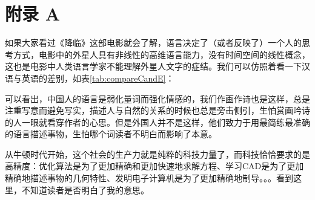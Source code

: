 \documentclass[UTF8,oneside]{ctexbook}
\begin{document}
\chapter*{附录 A}\label{fuluA}
如果大家看过《降临》这部电影就会了解，语言决定了（或者反映了）一个人的思考方式，电影中的外星人具有非线性的高维语言能力，没有时间空间的线性概念，这也是电影中人类语言学家不能理解外星人文字的症结。我们可以仿照着看一下汉语与英语的差别，如表\ref{tab:compareCandE}：

\begin{table}[!htb]
	\renewcommand{\arraystretch}{1.3} %
	\caption{中英对比}\label{tab:compareCandE}
	\centering
	\vspace{0.2cm}
\end{table}

可以看出，中国人的语言是弱化量词而强化情感的，我们作画作诗也是这样，总是注重写意而避免写实，描述人与自然的关系的时候也总是旁击侧引，生怕赏画吟诗的人一眼就看穿作者的心思。但是外国人并不是这样，他们致力于用最简练最准确的语言描述事物，生怕哪个词读者不明白而影响了本意。

从牛顿时代开始，这个社会的生产力就是纯粹的科技力量了，而科技恰恰要求的是高精度：优化算法是为了更加精确和更加快速地求解方程、学习CAD是为了更加精确地描述事物的几何特性、发明电子计算机是为了更加精确地制导。。。看到这里，不知道读者是否明白了我的意思。
\end{document}
